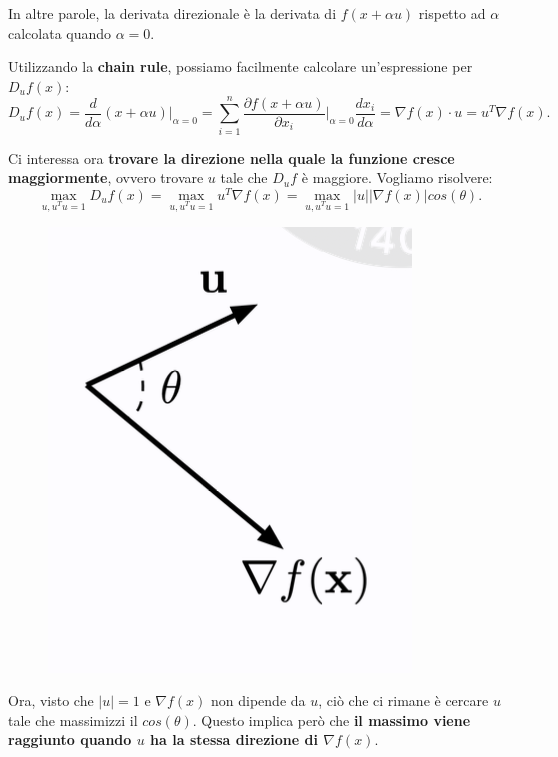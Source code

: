 In altre parole, la derivata direzionale è la derivata di $f(x+\alpha u)$ rispetto ad $\alpha$ calcolata quando $\alpha = 0$.


Utilizzando la \textbf{chain rule}, possiamo facilmente calcolare un'espressione per $D_uf(x)$:
\begin{equation}
    D_uf(x)=\frac{d}{d\alpha}(x+\alpha u)\Big|_{\alpha=0}=\sum^n_{i=1}\frac{\partial f(x+\alpha u)}{\partial x_i}\Big|_{\alpha = 0}\frac{dx_i}{d\alpha}=\nabla f(x)\cdot u = u^T\nabla f(x).
\end{equation}

\newpage
Ci interessa ora \textbf{trovare la direzione nella quale la funzione cresce maggiormente}, ovvero trovare $u$ tale che $D_uf$ è maggiore. Vogliamo risolvere:
\begin{equation}
    \max_{u,u^Tu=1}D_uf(x)=\max_{u,u^Tu=1}u^T\nabla f(x)=\max_{u,u^Tu=1}|u||\nabla f(x)|cos(\theta).
\end{equation}
\begin{figure}[!h]
    \includegraphics[scale=1]{images/prerequisites/maxGradient.png}
    \centering
\end{figure}



Ora, visto che $|u|=1$ e $\nabla f(x)$ non dipende da $u$, ciò che ci rimane è cercare $u$ tale che massimizzi il $cos(\theta)$. Questo implica però che \textbf{il massimo viene raggiunto quando $u$ ha la stessa direzione di $\nabla f(x)$}.
\newline

